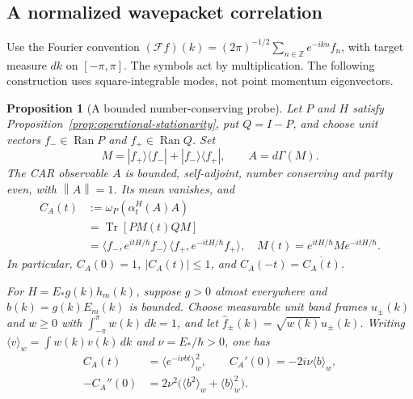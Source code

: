 \documentclass[11pt]{article}
\newcommand{\Tr}{\operatorname{Tr}}
\newcommand{\norm}[1]{\left\|#1\right\|}
\newtheorem{proposition}[theorem]{Proposition}
\theoremstyle{definition}
\begin{document}
\subsection{A normalized wavepacket correlation}

Use the Fourier convention
$(\mathcal Ff)(k)=(2\pi)^{-1/2}\sum_{n\in\mathbb Z}e^{-ikn}f_n$,
with target measure $dk$ on $[-\pi,\pi]$. The symbols act by multiplication.
The following construction uses square-integrable modes, not point
momentum eigenvectors.

\begin{proposition}[A bounded number-conserving probe]
\label{prop:operational-wavepacket}
Let $P$ and $H$ satisfy Proposition~\ref{prop:operational-stationarity},
put $Q=I-P$, and choose unit vectors $f_-\in\operatorname{Ran}P$ and
$f_+\in\operatorname{Ran}Q$. Set
\[
 M=|f_+\rangle\langle f_-|+|f_-\rangle\langle f_+|,
 \qquad A=d\Gamma(M).
\]
The CAR observable $A$ is bounded, self-adjoint, number conserving and
parity even, with $\norm{A}=1$. Its mean vanishes, and
\begin{equation}
\begin{split}
 C_A(t)&:=\omega_P(\alpha_t^H(A)A)\\
 &=\Tr\!\left[P M(t)Q M\right]\\
 &=\langle f_-,e^{itH/\hbar}f_-\rangle\,
   \langle f_+,e^{-itH/\hbar}f_+\rangle,
 \quad M(t)=e^{itH/\hbar}Me^{-itH/\hbar}.
\end{split}
\label{eq:operational-wavepacket-trace}
\end{equation}
In particular, $C_A(0)=1$, $|C_A(t)|\le1$, and
$C_A(-t)=\overline{C_A(t)}$.

For $H=E_*g(k)h_m(k)$, suppose $g>0$ almost everywhere and
$b(k)=g(k)E_m(k)$ is bounded. Choose measurable unit band frames $u_\pm(k)$
and $w\ge0$ with $\int_{-\pi}^{\pi}w(k)\,dk=1$, and let
$\widehat f_\pm(k)=\sqrt{w(k)}u_\pm(k)$. Writing
$\langle v\rangle_w=\int w(k)v(k)\,dk$ and $\nu=E_*/\hbar>0$, one has
\begin{equation}
\begin{split}
 C_A(t)&=\langle e^{-i\nu b t}\rangle_w^2,
 \qquad C_A'(0)=-2i\nu\langle b\rangle_w,\\
 -C_A''(0)&=2\nu^2\bigl(\langle b^2\rangle_w+\langle b\rangle_w^2\bigr).
\end{split}
 \label{eq:operational-wavepacket-curvature}
\end{equation}
\end{proposition}
\end{document}
